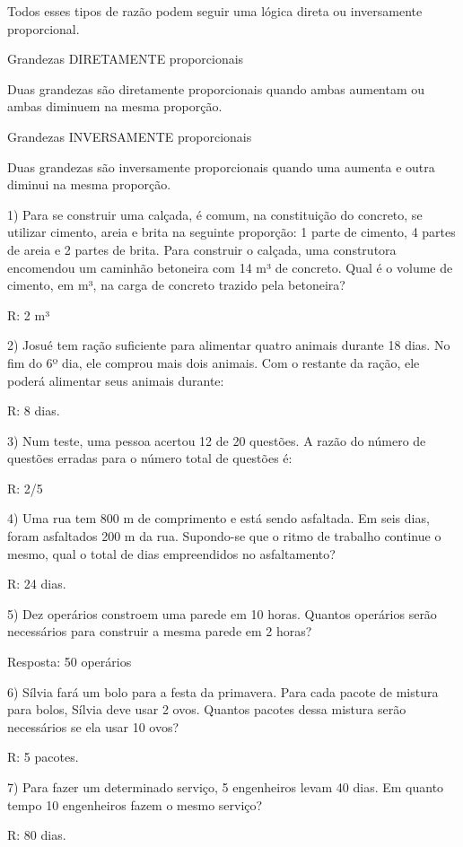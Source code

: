 Todos esses tipos de razão podem seguir uma lógica direta ou
inversamente proporcional.

Grandezas DIRETAMENTE proporcionais

Duas grandezas são diretamente proporcionais quando ambas aumentam ou
ambas diminuem na mesma proporção.

Grandezas INVERSAMENTE proporcionais

Duas grandezas são inversamente proporcionais quando uma aumenta e outra
diminui na mesma proporção.


1) Para se construir uma calçada, é comum, na constituição do concreto,
se utilizar cimento, areia e brita na seguinte proporção: 1 parte de
cimento, 4 partes de areia e 2 partes de brita. Para construir o
calçada, uma construtora encomendou um caminhão betoneira com 14 m³ de
concreto. Qual é o volume de cimento, em m³, na carga de concreto
trazido pela betoneira?

R: 2 m³

2) Josué tem ração suficiente para alimentar quatro animais durante 18
dias. No fim do 6º dia, ele comprou mais dois animais. Com o restante da
ração, ele poderá alimentar seus animais durante:

R: 8 dias.

3) Num teste, uma pessoa acertou 12 de 20 questões. A razão do número de
questões erradas para o número total de questões é:

R: 2/5

4) Uma rua tem 800 m de comprimento e está sendo asfaltada. Em seis
dias, foram asfaltados 200 m da rua. Supondo-se que o ritmo de trabalho
continue o mesmo, qual o total de dias empreendidos no asfaltamento?

R: 24 dias.

5) Dez operários constroem uma parede em 10 horas. Quantos operários
serão necessários para construir a mesma parede em 2 horas?

Resposta: 50 operários

6) Sílvia fará um bolo para a festa da primavera. Para cada pacote de
mistura para bolos, Sílvia deve usar 2 ovos. Quantos pacotes dessa
mistura serão necessários se ela usar 10 ovos?

R: 5 pacotes.

7) Para fazer um determinado serviço, 5 engenheiros levam 40 dias. Em
quanto tempo 10 engenheiros fazem o mesmo serviço?

R: 80 dias.

